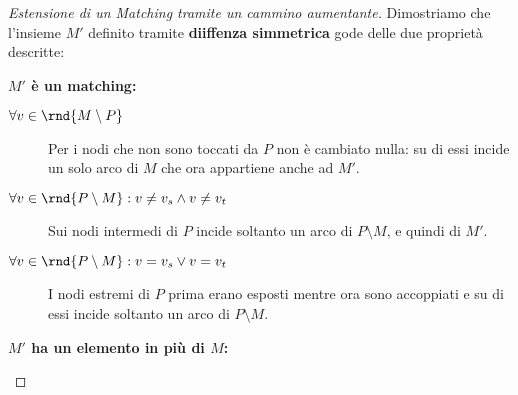 \documentclass[\main/main.tex]{subfiles}
\begin{document}
\begin{proof}[Estensione di un Matching tramite un cammino aumentante]
	Dimostriamo che l'insieme \(M'\) definito tramite \textbf{diiffenza simmetrica} gode delle due proprietà descritte:
	\begin{description}
		\item \textbf{\(M'\) è un matching:}
		      \begin{description}
			      \item[\(\forall v \in \rnd{M \setminus P}\)] Per i nodi che non sono toccati da \(P\) non è cambiato nulla: su di essi incide un solo arco di \(M\) che ora appartiene anche ad \(M'\).
			      \item[\(\forall v \in \rnd{P \setminus M}: v\neq v_s \land v \neq v_t\)] Sui nodi intermedi di \(P\) incide soltanto un arco di \(P\setminus M\), e quindi di \(M'\).
			      \item[\(\forall v \in \rnd{P \setminus M}: v= v_s \lor v = v_t\)] I nodi estremi di \(P\) prima erano esposti mentre ora sono accoppiati e su di essi incide soltanto un arco di \(P\setminus M\).
		      \end{description}
		\item \textbf{\(M'\) ha un elemento in più di \(M\):}
	\end{description}
\end{proof}
\clearpage
\end{document}
